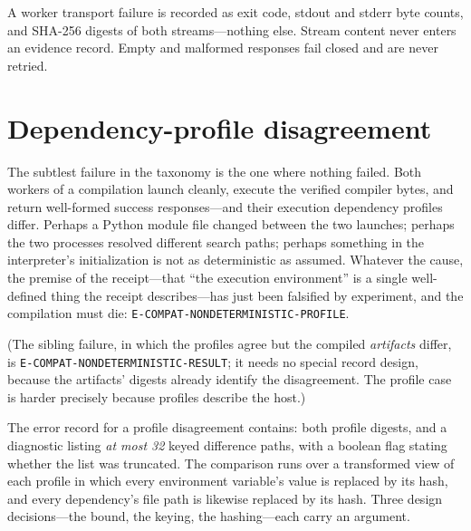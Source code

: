\begin{ruleenv}\label{ch08:rule:transport}
A worker transport failure is recorded as exit code, stdout and stderr byte counts, and SHA-256 digests of both streams---nothing else. Stream content never enters an evidence record. Empty and malformed responses fail closed and are never retried.
\end{ruleenv}

\section{Dependency-profile disagreement}\label{ch08:disagreement}

The subtlest failure in the taxonomy is the one where nothing failed. Both workers of a compilation launch cleanly, execute the verified compiler bytes, and return well-formed success responses---and their execution dependency profiles differ. Perhaps a Python module file changed between the two launches; perhaps the two processes resolved different search paths; perhaps something in the interpreter's initialization is not as deterministic as assumed. Whatever the cause, the premise of the receipt---that ``the execution environment'' is a single well-defined thing the receipt describes---has just been falsified by experiment, and the compilation must die: \texttt{E-COMPAT-NONDETERMINISTIC-PROFILE}.

(The sibling failure, in which the profiles agree but the compiled \emph{artifacts} differ, is \texttt{E-COMPAT-NONDETERMINISTIC-RESULT}; it needs no special record design, because the artifacts' digests already identify the disagreement. The profile case is harder precisely because profiles describe the host.)

The error record for a profile disagreement contains: both profile digests, and a diagnostic listing \emph{at most 32} keyed difference paths, with a boolean flag stating whether the list was truncated. The comparison runs over a transformed view of each profile in which every environment variable's value is replaced by its hash, and every dependency's file path is likewise replaced by its hash. Three design decisions---the bound, the keying, the hashing---each carry an argument.


